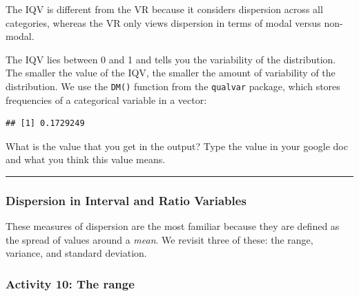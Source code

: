 \documentclass[
]{book}
\newenvironment{Shaded}{\begin{snugshade}}{\end{snugshade}}
\newcommand{\AttributeTok}[1]{\textcolor[rgb]{0.77,0.63,0.00}{#1}}
\newcommand{\CommentTok}[1]{\textcolor[rgb]{0.56,0.35,0.01}{\textit{#1}}}
\newcommand{\ConstantTok}[1]{\textcolor[rgb]{0.00,0.00,0.00}{#1}}
\newcommand{\FunctionTok}[1]{\textcolor[rgb]{0.00,0.00,0.00}{#1}}
\newcommand{\NormalTok}[1]{#1}
\newcommand{\OtherTok}[1]{\textcolor[rgb]{0.56,0.35,0.01}{#1}}
\newcommand{\SpecialCharTok}[1]{\textcolor[rgb]{0.00,0.00,0.00}{#1}}
\begin{document}
The IQV is different from the VR because it considers dispersion across all categories, whereas the VR only views dispersion in terms of modal versus non-modal.

The IQV lies between 0 and 1 and tells you the variability of the distribution. The smaller the value of the IQV, the smaller the amount of variability of the distribution. We use the \texttt{DM()} function from the \texttt{qualvar} package, which stores frequencies of a categorical variable in a vector:

\begin{Shaded}
\end{Shaded}

\begin{verbatim}
## [1] 0.1729249
\end{verbatim}

What is the value that you get in the output? Type the value in your google doc and what you think this value means.

\begin{center}\rule{0.5\linewidth}{0.5pt}\end{center}

\hypertarget{dispersion-in-interval-and-ratio-variables}{%
\subsubsection{\texorpdfstring{\textbf{Dispersion in Interval and Ratio Variables}}{Dispersion in Interval and Ratio Variables}}\label{dispersion-in-interval-and-ratio-variables}}

These measures of dispersion are the most familiar because they are defined as the spread of values around a \emph{mean}. We revisit three of these: the range, variance, and standard deviation.

\hypertarget{activity-10-the-range}{%
\subsubsection{Activity 10: The range}\label{activity-10-the-range}}
\end{document}
